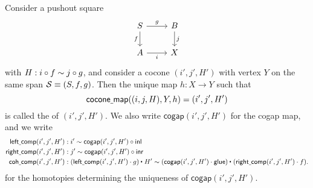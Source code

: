 \begin{defn}
Consider a pushout square
\begin{equation*}
\begin{tikzcd}
S \arrow[r,"g"] \arrow[d,swap,"f"] & B \arrow[d,"j"] \\
A \arrow[r,swap,"i"] & X
\end{tikzcd}
\end{equation*}
with $H:i\circ f \sim j\circ g$, and consider a cocone $(i',j',H')$ with vertex $Y$ on the same span $\mathcal{S}\equiv(S,f,g)$. Then the unique map $h:X\to Y$ such that 
\begin{equation*}
\mathsf{cocone\underline{\ }{}map}((i,j,H),Y,h)= (i',j',H')
\end{equation*}
is called the  of $(i',j',H')$. We also write $\mathsf{cogap}(i',j',H')$ for the cogap map, and we write
\begin{align*}
\mathsf{left\usc{}comp}(i',j',H') & : i' \htpy \mathsf{cogap}(i',j',H')\circ \inl  \\
\mathsf{right\usc{}comp}(i',j',H') & : j' \htpy \mathsf{cogap}(i',j',H')\circ \inr  \\
\mathsf{coh\usc{}comp}(i',j',H') & : \ct{(\mathsf{left\usc{}comp}(i',j',H')\cdot g)}{H'} \htpy \ct{(\mathsf{cogap}(i',j',H')\cdot \glue)}{(\mathsf{right\usc{}comp}(i',j',H')\cdot f)}.
\end{align*}
for the homotopies determining the uniqueness of $\mathsf{cogap}(i',j',H')$.
\end{defn}

